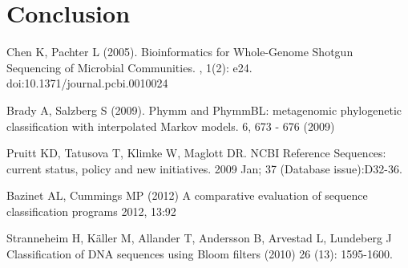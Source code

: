 \documentclass[12pt]{article} %
\begin{document}
\section{Conclusion}




\begin{thebibliography}{99} %
Chen K, Pachter L (2005). 
\newblock Bioinformatics for Whole-Genome Shotgun Sequencing of Microbial Communities. 
, 1(2): e24. doi:10.1371/journal.pcbi.0010024

Brady A, Salzberg S (2009).
\newblock Phymm and PhymmBL: metagenomic phylogenetic classification with interpolated Markov models.
 6, 673 - 676 (2009) 

Pruitt KD, Tatusova T, Klimke W, Maglott DR. 
\newblock NCBI Reference Sequences: current status, policy and new initiatives. 
 2009 Jan; 37 (Database issue):D32-36.

Bazinet AL, Cummings MP (2012)
\newblock A comparative evaluation of sequence classification programs
 2012, 13:92

Stranneheim H, Käller M,  Allander T,  Andersson B,  Arvestad L,  Lundeberg J 
\newblock Classification of DNA sequences using Bloom filters
 (2010) 26 (13): 1595-1600.

\end{thebibliography}
\end{document}
